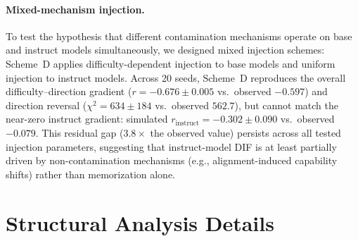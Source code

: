 \paragraph{Mixed-mechanism injection.}
\label{app:mixed_mechanism}
To test the hypothesis that different contamination mechanisms operate on base and instruct models simultaneously, we designed mixed injection schemes: Scheme~D applies difficulty-dependent injection to base models and uniform injection to instruct models. Across 20 seeds, Scheme~D reproduces the overall difficulty--direction gradient ($r = -0.676 \pm 0.005$ vs.\ observed $-0.597$) and direction reversal ($\chi^2 = 634 \pm 184$ vs.\ observed $562.7$), but cannot match the near-zero instruct gradient: simulated $r_{\mathrm{instruct}} = -0.302 \pm 0.090$ vs.\ observed $-0.079$. This residual gap ($3.8\times$ the observed value) persists across all tested injection parameters, suggesting that instruct-model DIF is at least partially driven by non-contamination mechanisms (e.g., alignment-induced capability shifts) rather than memorization alone.


\section{Structural Analysis Details}
\label{app:structural}

\begin{table}[h]
\centering
\caption{Structural controls and sensitivity checks for temporal DIF. None reduces C\% below 31\%; $\theta$-conditioning serves as a sensitivity check confirming total-score adequacy.}
\label{tab:structural_comparison}
\small
{}
\end{table}

